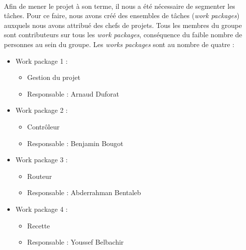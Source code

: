 \paragraph{}Afin de mener le projet à son terme, il nous a été nécessaire de segmenter les tâches. Pour ce faire, nous avons créé des ensembles de tâches
(\textit{work packages}) auxquels nous avons attribué des chefs de projets. Tous les
membres du groupe sont contributeurs sur tous les \textit{work packages}, conséquence du faible nombre de personnes au sein du groupe.
Les \textit{works packages} sont au nombre de quatre :
\newline
\begin{itemize}
\item Work package 1 :
    \begin{itemize}
	\item Gestion du projet
	\item Responsable : Arnaud Duforat 
    \end{itemize}
\vspace{1em}
\item Work package 2 :
    \begin{itemize}
	\item Contrôleur
	\item Responsable : Benjamin Bougot
    \end{itemize}
\vspace{1em}
\item Work package 3 :
    \begin{itemize}
	\item Routeur
	\item Responsable : Abderrahman Bentaleb
    \end{itemize}
\vspace{1em}
\item Work package 4 :
    \begin{itemize}
	\item Recette
	\item Responsable : Youssef Belbachir
    \end{itemize}
\end{itemize}
